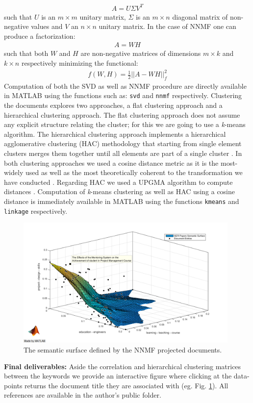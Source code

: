 \documentclass[11pt,english]{article}
\begin{document}
\begin{align*}
A = U \Sigma V^T
\end{align*}
such that $U$ is an $m \times m$ unitary matrix, $\Sigma$ is an $m \times n$ diagonal matrix of non-negative values and $V$ an $n \times n$ unitary matrix. In the case of NNMF one can produce a factorization:
\begin{align*}
A = WH
\end{align*}
such that both $W$ and $H$ are non-negative matrices of dimensions $m \times k$ and $k \times n$ respectively  minimizing the functional:
\begin{align*}
f(W,H) = \frac{1}{2} || A - WH ||_f^2
\end{align*} 
Computation of both the SVD as well as NNMF procedure are directly available in MATLAB using the functions such as: \texttt{svd} and \texttt{nnmf} respectively. Clustering the documents explores two approaches, a flat clustering approach and a hierarchical clustering approach. The flat clustering approach does not assume any explicit structure relating the cluster; for this we are going to use a \textit{k}-means algorithm. The hierarchical clustering approach implements a hierarchical agglomerative clustering (HAC) methodology that starting from single element clusters merges them together until all elements are part of a single cluster \cite{manning2008introduction}. In both clustering approaches we used a cosine distance metric as it is the most-widely used as well as the most theoretically coherent to the transformation we have conducted \cite{landauer1998introduction,steinbach2000comparison,shahnaz2006document}. Regarding HAC we used a UPGMA algorithm to compute distances \cite{steinbach2000comparison,fung2003hierarchical}.  Computation of \textit{k}-means clustering as well as HAC using a cosine distance is immediately available in MATLAB using the functions \texttt{kmeans} and \texttt{linkage} respectively.\\ 
\begin{figure}[t]
    \centering
\includegraphics[width=0.98\textwidth]{FinalFigure1858.png}
\caption{The semantic surface defined by the NNMF projected documents.} \label{FIG1}
\end{figure} 
\textbf{Final deliverables:}
Aside the correlation and hierarchical clustering matrices between the keywords we provide an interactive figure where clicking at the data-points returns the document title they are associated with (eg. Fig. \ref{FIG1}). All references are available in the author's public folder.



\end{document}
